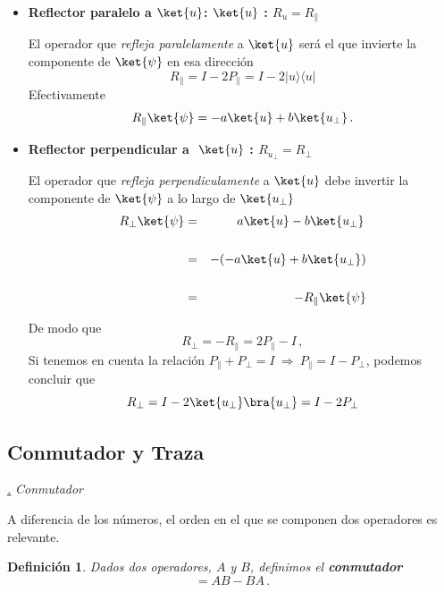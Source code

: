 \documentclass[a4paper,11pt]{book} %
\newtheorem{definicion_contador}{Definición}
\newcommand{\Definicion}[1]{
		\begin{mybox_gray2}{}
			\begin{definicion_contador}
				 #1 
			\end{definicion_contador} 
		\end{mybox_gray2}
	}
\numberwithin{equation}{chapter}
\newcommand{\ketbra}[2]{| #1\rangle \! \langle #2|}
\def\subsubiContadorIt{\par\addtocounter{subsubsection}{1}\underline{\it\thesubsubsection.}\hskip0.5cm \setcounter{subsubsubsectionIt}{0}}
\newcommand{\SubsubiIt}[1]{
		\subsubiContadorIt \textit{#1}
	}
\newcounter{subsubsubsectionIt}[subsubsection]
\begin{document}
\begin{itemize}
	\item \textbf{Reflector paralelo a $\ket{u}$: $\ket{u}~$: $R_u = R_\|$}
	
	El operador que \textit{refleja  paralelamente} a $\ket{u}$ será  el que invierte la componente de $\ket{\psi}$ en esa dirección
	\begin{equation}
	\boxed{R_\| =  I - 2P_\| = I - 2\ketbra{u}{u}}
	\end{equation}
Efectivamente 
\begin{equation} 
R_\|\ket{\psi} = - a \ket{u} + b \ket{u_\perp}\, .
\end{equation} 

	\item \textbf{Reflector perpendicular a $~\ket{u}~$: $R_{u_\perp} = R_\perp$}
	
	El operador que \textit{refleja  perpendiculamente} a $\ket{u}$ debe invertir la componente de $\ket{\psi}$ a lo largo de $\ket{u_\perp}$ 
\begin{eqnarray*}
R_\perp\ket{\psi} &=&  a \ket{u} - b \ket{u_\perp}\,  \\ \rule{0mm}{8mm}
&=& - (-a \ket{u} + b \ket{u_\perp}) \\ \rule{0mm}{8mm}
&=& -R_\| \ket{\psi}
\end{eqnarray*}

De modo que 
	\begin{equation}
	\boxed{R_\perp = -R_\| = 2P_\| - I} \, ,
	\end{equation}
Si tenemos en cuenta la relación  $P_\| + P_\perp = I~ \Rightarrow ~P_\| = I - P_\perp$, podemos concluir que
	\begin{equation}
	R_\perp = I - 2\ket{u_\perp}\bra{u_\perp} = I - 2 P_\perp
	\end{equation}
\end{itemize}	
	



		\subsection{Conmutador y Traza}




			\SubsubiIt{Conmutador}

A diferencia de los números, el orden en el que se componen dos operadores es relevante.

	\Definicion{
	Dados dos operadores, $A$ y $B$, definimos el \textbf{conmutador}
	\begin{equation}
	[A,B] = AB-BA \,.
	\end{equation}
	}
\end{document}
